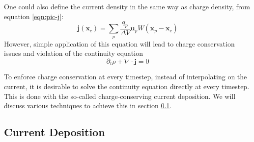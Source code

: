 One could also define the current density in the same way as charge density,
from equation \eqref{eqn:pic-j}:
\begin{equation}
  \label{eq:naive-j}
  \mathbf{j} ( \mathbf{x}_{c} ) = \sum_{p} \frac{q_{p}}{\Delta V}\mathbf{u}_p W (
  \mathbf{x}_{p} -\mathbf{x}_{c} )
\end{equation}
However, simple application of this equation will lead to charge
conservation issues and violation of the continuity equation
\begin{equation}
    \label{eq:continuity}
    \partial_t\rho + \nabla\cdot \mathbf{j} = 0
\end{equation}

To enforce charge conservation at every timestep, instead of interpolating on
the current, it is desirable to solve the continuity equation directly at every
timestep. This is done with the so-called charge-conserving current deposition.
We will discuss various techniques to achieve this in section
\ref{sec:charge-cons-curr}.




\subsection{Current Deposition}
\label{sec:charge-cons-curr}

